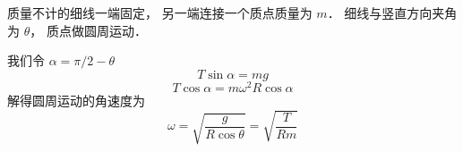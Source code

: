 
\begin{issues}
\issueDraft
\end{issues}



质量不计的细线一端固定， 另一端连接一个质点质量为 $m$． 细线与竖直方向夹角为 $\theta$， 质点做圆周运动．

我们令 $\alpha = \pi/2 - \theta$
\begin{equation}
T\sin\alpha = mg
\end{equation}
\begin{equation}
T\cos\alpha = m\omega^2 R\cos\alpha
\end{equation}
解得圆周运动的角速度为
\begin{equation}
\omega = \sqrt{\frac{g}{R\cos\theta}} = \sqrt{\frac{T}{Rm}}
\end{equation}
